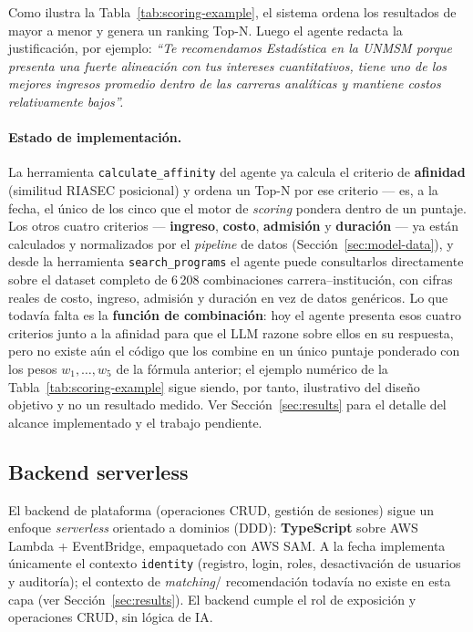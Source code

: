 Como ilustra la Tabla~\ref{tab:scoring-example}, el sistema ordena los resultados de mayor a menor y genera un ranking Top-N.
Luego el agente redacta la justificaci\'on, por ejemplo: \textit{``Te
recomendamos Estad\'istica en la UNMSM porque presenta una fuerte alineaci\'on
con tus intereses cuantitativos, tiene uno de los mejores ingresos promedio
dentro de las carreras anal\'iticas y mantiene costos relativamente bajos''.}

\paragraph{Estado de implementaci\'on.} La herramienta
\texttt{calculate\_affinity} del agente ya calcula el criterio de
\textbf{afinidad} (similitud RIASEC posicional) y ordena un Top-N por ese
criterio --- es, a la fecha, el \'unico de los cinco que el motor de
\emph{scoring} pondera dentro de un puntaje. Los otros cuatro criterios ---
\textbf{ingreso}, \textbf{costo}, \textbf{admisi\'on} y \textbf{duraci\'on} ---
ya est\'an calculados y normalizados por el \emph{pipeline} de datos
(Secci\'on~\ref{sec:model-data}), y desde la herramienta
\texttt{search\_programs} el agente puede consultarlos directamente sobre el
dataset completo de 6\,208 combinaciones carrera--instituci\'on, con cifras
reales de costo, ingreso, admisi\'on y duraci\'on en vez de datos gen\'ericos.
Lo que todav\'ia falta es la \textbf{funci\'on de combinaci\'on}: hoy el agente
presenta esos cuatro criterios junto a la afinidad para que el LLM razone
sobre ellos en su respuesta, pero no existe a\'un el c\'odigo que los combine
en un \'unico puntaje ponderado con los pesos $w_1,\dots,w_5$ de la
f\'ormula anterior; el ejemplo num\'erico de la Tabla~\ref{tab:scoring-example}
sigue siendo, por tanto, ilustrativo del dise\~no objetivo y no un resultado
medido. Ver Secci\'on~\ref{sec:results} para el detalle del alcance
implementado y el trabajo pendiente.

\subsection{Backend serverless}

El backend de plataforma (operaciones CRUD, gesti\'on de sesiones) sigue un
enfoque \emph{serverless} orientado a dominios (DDD): \textbf{TypeScript} sobre
AWS Lambda + EventBridge, empaquetado con AWS SAM. A la fecha implementa
\'unicamente el contexto \texttt{identity} (registro, login, roles,
desactivaci\'on de usuarios y auditor\'ia); el contexto de \emph{matching}/
recomendaci\'on todav\'ia no existe en esta capa (ver
Secci\'on~\ref{sec:results}). El backend cumple el rol de exposici\'on y
operaciones CRUD, sin l\'ogica de IA.

